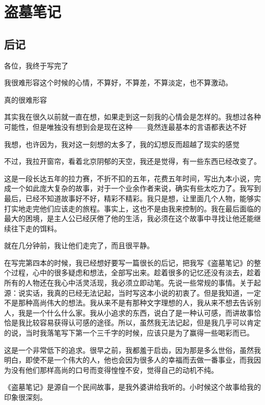 \part{盗墓笔记}
\chapter{后记}

各位，我终于写完了

我很难形容这个时候的心情，不算好，不算差，不算淡定，也不算激动。

真的很难形容

其实我在很久以前就一直在想，如果走到这一刻我的心情会是怎样的。我想过各种可能性，但是唯独没有想到会是现在这种——竟然连最基本的言语都表达不好

我想，也许因为，我对这一刻想的太多了，我的幻想反而超越了现实的感觉

不过，我拉开窗帘，看着北京阴郁的天空，我还是觉得，有一些东西已经改变了。

这是一段长达五年的拉力赛，不折不扣的五年，花费五年时间，写出九本小说，完成一个如此庞大复杂的故事，对于一个业余作者来说，确实有些太吃力了。我写到最后，已经不知道故事好不好，精彩不精彩。我只是想，让里面几个人物，能够实打实地走完他们应该走的旅程。事实上，这也不是由我来控制的。我在最后面临的最大的困境，是主人公已经厌倦了他的生活，我必须在这个故事中寻找让他还能继续往下走的饵料。

就在几分钟前，我让他们走完了，而且很平静。

在写完第四本的时候，我已经想好要写一篇很长的后记，把我写《盗墓笔记》的整个过程，心中的很多疑虑和想法，全部写出来。趁着很多的记忆还没有淡去，趁着所有的人物还在我心中活灵活现，我必须立即动笔。先说一些常规的事情。关于起源：说实话，我真的已经无法记起，当时写这本小说的初衷了。但是我知道，一定不是那种高尚伟大的想法。我从来不是有那种文字理想的人，我从来不想去告诉别人，我是一个什么什么家。我从小追求的东西，说白了是一种认可感，而讲故事恰恰是我比较容易获得认可感的途径。所以，虽然我无法记起，但是我几乎可以肯定的说，当时我落笔写下第一个三千字的时候，应该只是为了赢得一些喝彩而已。

这是一个非常低下的追求。很早之前，我都羞于启齿，因为那是多么世俗，虽然我明白，即使不是一个伟大的人，他也会因为很多人的幸福而去做一番事业，而我因为没有他们那样高尚的口号而变得惶惶不安，觉得自己的动机不纯。

《盗墓笔记》是源自一个民间故事，是我外婆讲给我听的。小时候这个故事给我的印象很深刻。

